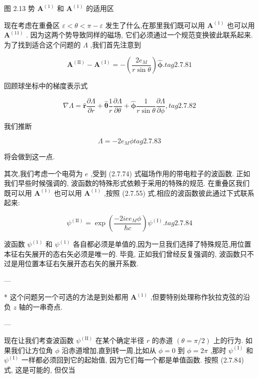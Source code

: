 \documentclass[lang=cn,newtx,10pt,scheme=chinese,thmcnt=section]{elegantbook}
\begin{document}
图 2.13 势 ${\mathbf{A}}^{\left( 1\right) }$ 和 ${\mathbf{A}}^{\left( 1\right) }$ 的适用区

现在考虑在重叠区 $\varepsilon < \theta < \pi - \varepsilon$ 发生了什么,在那里我们既可以用 ${\mathbf{A}}^{\left( 1\right) }$ 也可以用 ${\mathbf{A}}^{\left( 11\right) }$ . 因为这两个势导致同样的磁场, 它们必须通过一个规范变换彼此联系起来. 为了找到适合这个问题的 $\Lambda$ ,我们首先注意到

$$
{\mathbf{A}}^{\left( \mathrm{{II}}\right) } - {\mathbf{A}}^{\left( \mathrm{I}\right) } = - \left( \frac{2{e}_{M}}{r\sin \theta }\right) \widehat{\mathbf{\phi }}. tag{2. 7.81}
$$

回顾球坐标中的梯度表示式

$$
\nabla \Lambda = \widehat{\mathbf{r}}\frac{\partial \Lambda }{\partial r} + \widehat{\mathbf{\theta }}\frac{1}{r}\frac{\partial \Lambda }{\partial \theta } + \widehat{\mathbf{\phi }}\frac{1}{r\sin \theta }\frac{\partial \Lambda }{\partial \phi }, tag{2.7.82}
$$

我们推断

$$
\Lambda = - 2{e}_{M}\phi tag{2. 7.83}
$$

将会做到这一点.

其次,我们考虑一个电荷为 $e$ ,受到 (2.7.74) 式磁场作用的带电粒子的波函数. 正如我们早些时候强调的, 波函数的特殊形式依赖于采用的特殊的规范. 在重叠区我们既可以用 ${\mathbf{A}}^{\left( 1\right) }$ 也可以用 ${\mathbf{A}}^{\left( 1\right) }$ ,按照 (2.7.55) 式,相应的波函数彼此通过下式联系起来:

$$
{\psi }^{\left( \mathrm{{II}}\right) } = \exp \left( \frac{-{2ie}{e}_{M}\phi }{\hbar c}\right) {\psi }^{\left( \mathrm{I}\right) }. tag{2. 7.84}
$$

波函数 ${\psi }^{\left( 1\right) }$ 和 ${\psi }^{\left( 1\right) }$ 各自都必须是单值的,因为一旦我们选择了特殊规范,用位置本征右矢展开的态右矢必须是唯一的. 毕竟, 正如我们曾经反复强调的, 波函数只不过是用位置本征右矢展开态右矢的展开系数.

---

* 这个问题另一个可选的方法是到处都用 ${\mathbf{A}}^{\left( 1\right) }$ ,但要特别处理称作狄拉克弦的沿负 $z$ 轴的一串奇点.

---

现在让我们考查波函数 ${\psi }^{\left( \mathrm{{II}}\right) }$ 在某个确定半径 $r$ 的赤道 $\left( {\theta = \pi /2}\right)$ 上的行为. 如果我们让方位角 $\phi$ 沿赤道增加,直到转一周,比如从 $\phi = 0$ 到 $\phi = {2\pi }$ ,那时 ${\psi }^{\left( \mathrm{I}\right) }$ 和 ${\psi }^{\left( \mathrm{I}\right) }$ 一样都必须回到它的起始值, 因为它们每一个都是单值函数. 按照 (2.7.84) 式, 这是可能的, 但仅当
\end{document}
